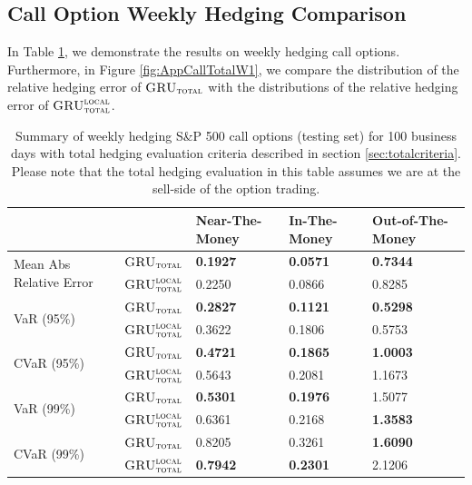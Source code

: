 \documentclass[letterpaper,12pt,titlepage,oneside,final]{book}
\numberwithin{equation}{section}
\theoremstyle{definition}
\newcommand{\modelT}{\textsc{GRU}_{\textsc{total}}}
\newcommand{\modelL}{\textsc{GRU}_{\textsc{total}}^{\textsc{local}}}
\begin{document}
\subsection{Call Option Weekly Hedging Comparison}
In Table \ref{table:AppCallTotalW}, we demonstrate the results on weekly hedging call options. Furthermore, in Figure \ref{fig:AppCallTotalW1}, we compare the distribution of the relative hedging error of $\modelT$ with the distributions of the relative hedging error of $\modelL$.
\begin{table}[htp!]
	\centering
	\begin{tabular}{ll|l|l|l|}
		\cline{3-5}
		&          & Near-The-Money   & In-The-Money     & Out-of-The-Money \\ \hline
		\multicolumn{1}{|l|}{\multirow{2}{*}{Mean Abs Relative Error}} & $\modelT$    & \textbf{0.1927}  & \textbf{0.0571}  & \textbf{0.7344}  \\  
		\multicolumn{1}{|l|}{}                                & $\modelL$    & 0.2250           & 0.0866           & 0.8285           \\ \hline 
		\multicolumn{1}{|l|}{\multirow{2}{*}{VaR (95\%)}}     & $\modelT$    & \textbf{0.2827} & \textbf{0.1121} & \textbf{0.5298} \\  
		\multicolumn{1}{|l|}{}                                & $\modelL$    & 0.3622          & 0.1806          & 0.5753          \\\hline   
		\multicolumn{1}{|l|}{\multirow{2}{*}{CVaR (95\%)}}    & $\modelT$    & \textbf{0.4721} & \textbf{0.1865} & \textbf{1.0003} \\  
		\multicolumn{1}{|l|}{}                                & $\modelL$    & 0.5643          & 0.2081          & 1.1673          \\ \hline  
		\multicolumn{1}{|l|}{\multirow{2}{*}{VaR (99\%)}}     & $\modelT$    & \textbf{0.5301} & \textbf{0.1976} & 1.5077          \\  
		\multicolumn{1}{|l|}{}                                & $\modelL$    & 0.6361          & 0.2168          & \textbf{1.3583}          \\  \hline 
		\multicolumn{1}{|l|}{\multirow{2}{*}{CVaR (99\%)}}    & $\modelT$    & 0.8205          & 0.3261 & \textbf{1.6090}          \\  
		\multicolumn{1}{|l|}{}                                & $\modelL$    & \textbf{0.7942} & \textbf{0.2301}          & 2.1206          \\  \hline 
	\end{tabular}
	\caption{Summary of weekly hedging S\&P 500 call options (testing set) for 100 business days with total hedging evaluation criteria described in  section \ref{sec:totalcriteria}. Please note that the total hedging evaluation in this table assumes we are at the sell-side of the option trading.} \label{table:AppCallTotalW}
\end{table}
\end{document}
